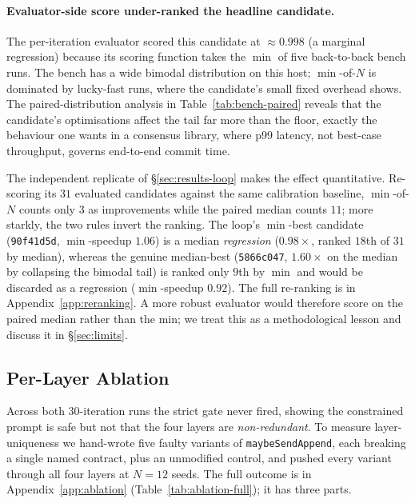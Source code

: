 \documentclass{article}
\begin{document}
\paragraph{Evaluator-side score under-ranked the headline candidate.}
The per-iteration evaluator scored this candidate at
$\approx\!0.998$ (a marginal regression) because its scoring
function takes the $\min$ of five back-to-back bench runs. The bench
has a wide bimodal distribution on this host; $\min$-of-$N$ is
dominated by lucky-fast runs, where the candidate's small fixed
overhead shows. The paired-distribution analysis in
Table~\ref{tab:bench-paired} reveals that the candidate's
optimisations affect the tail far more than the floor, exactly the
behaviour one wants in a consensus library, where p99 latency, not
best-case throughput, governs end-to-end commit time.

The independent replicate of \S\ref{sec:results-loop} makes the
effect quantitative. Re-scoring its $31$ evaluated candidates against
the same calibration baseline, $\min$-of-$N$ counts only $3$ as
improvements while the paired median counts $11$; more starkly, the
two rules invert the ranking. The loop's $\min$-best candidate
(\texttt{90f41d5d}, $\min$-speedup $1.06$) is a median \emph{regression}
($0.98\times$, ranked $18$th of $31$ by median), whereas the genuine
median-best (\texttt{5866c047}, $1.60\times$ on the median by
collapsing the bimodal tail) is ranked only $9$th by $\min$ and would
be discarded as a regression ($\min$-speedup $0.92$). The full
re-ranking is in Appendix~\ref{app:reranking}. A more robust evaluator
would therefore score on the paired median rather than the min; we
treat this as a methodological lesson and discuss it in
\S\ref{sec:limits}.

\subsection{Per-Layer Ablation}
\label{sec:results-ablation}
Across both $30$-iteration runs the strict gate never fired, showing
the constrained prompt is safe but not that the four layers are
\emph{non-redundant}. To measure layer-uniqueness we hand-wrote five
faulty variants of \texttt{maybeSendAppend}, each breaking a single
named contract, plus an unmodified control, and pushed every variant
through all four layers at $N=12$ seeds. The full outcome is in
Appendix~\ref{app:ablation} (Table~\ref{tab:ablation-full}); it has
three parts.
\end{document}
